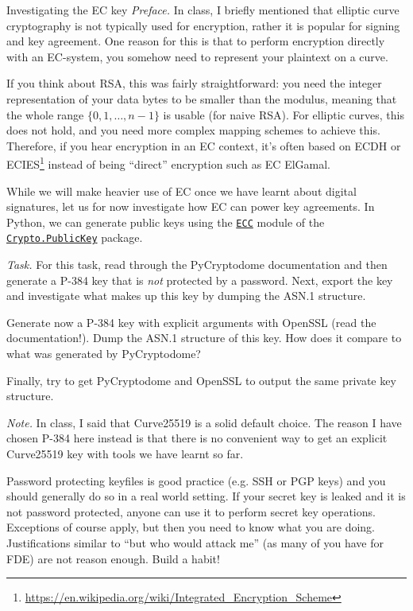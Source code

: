 \documentclass{practice}
\begin{document}
\begin{task}{Investigating the EC key}
  \textit{Preface.}
  In class, I briefly mentioned that elliptic curve cryptography is not typically used for encryption, rather it is popular for signing and key agreement.
  One reason for this is that to perform encryption directly with an EC-system, you somehow need to represent your plaintext on a curve.

  If you think about RSA, this was fairly straightforward: you need the integer representation of your data bytes to be smaller than the modulus, meaning that the whole range $\{0, 1, \dots, n - 1\}$ is usable (for naive RSA).
  For elliptic curves, this does not hold, and you need more complex mapping schemes to achieve this.
  Therefore, if you hear encryption in an EC context, it's often based on ECDH or ECIES\footnote{\url{https://en.wikipedia.org/wiki/Integrated_Encryption_Scheme}} instead of being \enquote{direct} encryption such as EC ElGamal. 

  While we will make heavier use of EC once we have learnt about digital signatures, let us for now investigate how EC can power key agreements.
  In Python, we can generate public keys using the \href{https://pycryptodome.readthedocs.io/en/latest/src/public_key/ecc.html}{\texttt{ECC}} module of the \href{https://pycryptodome.readthedocs.io/en/latest/src/public_key/public_key.html}{\texttt{Crypto.PublicKey}} package.

  \textit{Task.}
  For this task, read through the PyCryptodome documentation and then generate a P-384 key that is \emph{not} protected by a password.
  Next, export the key and investigate what makes up this key by dumping the ASN.1 structure.

  Generate now a P-384 key with explicit arguments with OpenSSL (read the documentation!).
  Dump the ASN.1 structure of this key.
  How does it compare to what was generated by PyCryptodome?

  Finally, try to get PyCryptodome and OpenSSL to output the same private key structure.

  \textit{Note.}
  In class, I said that Curve25519 is a solid default choice.
  The reason I have chosen P-384 here instead is that there is no convenient way to get an explicit Curve25519 key with tools we have learnt so far.

  \begin{tcolorbox}[title=Warning]
    Password protecting keyfiles is good practice (e.g. SSH or PGP keys) and you should generally do so in a real world setting.
    If your secret key is leaked and it is not password protected, anyone can use it to perform secret key operations.
    \tcblower
    Exceptions of course apply, but then you need to know what you are doing.
    Justifications similar to \enquote{but who would attack me} (as many of you have for FDE) are not reason enough.
    Build a habit!
  \end{tcolorbox}
\end{task}
\end{document}
